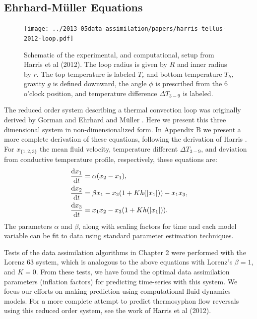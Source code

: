 \documentclass[12pt]{report}
\newcommand{\diff}[2]{\frac{{\rm d}#1}{{\rm d}#2}}
\begin{document}
\subsection{Ehrhard-M\"{u}ller Equations}

\begin{figure}[t!]
  \centering
  \texttt{[image: ../2013-05data-assimilation/papers/harris-tellus-2012-loop.pdf]}
  \caption[Schematic of the experimental, and computational, setup from Harris et al (2012)]{
    Schematic of the experimental, and computational, setup from Harris et al (2012).
    The loop radius is given by $R$ and inner radius by $r$.
    The top temperature is labeled $T_c$ and bottom temperature $T_h$, gravity $g$ is defined downward, the angle $\phi$ is prescribed from the 6 o'clock position, and temperature difference $\Delta T_{3-9}$ is labeled.
  }
  \label{fig:thermosyphons}
\end{figure}

The reduced order system describing a thermal convection loop was originally derived by Gorman  and Ehrhard and M\"{u}ller .
Here we present this three dimensional system in non-dimensionalized form.
In Appendix B we present a more complete derivation of these equations, following the derivation of Harris .
For $x_{\{1,2,3\}}$ the mean fluid velocity, temperature different $\Delta T_{3-9}$, and deviation from conductive temperature profile, respectively, these equations are:
\begin{align}
& \diff{x_1}{t} = \alpha (x_2 - x_1),\\
& \diff{x_2}{t} = \beta x_1 - x_2 (1 + Kh(|x_1|)) - x_1x_3,\\
& \diff{x_3}{t} = x_1x_2 - x_3 (1 + Kh(|x_1|)) .\end{align}
The parameters $\alpha$ and $\beta$, along with scaling factors for time and each model variable can be fit to data using standard parameter estimation techniques.

Tests of the data assimilation algorithms in Chapter 2 were performed with the Lorenz 63 system, which is analogous to the above equations with Lorenz's $\beta = 1$, and $K = 0$.
From these tests, we have found the optimal data assimilation parameters (inflation factors) for predicting time-series with this system.
We focus our efforts on making prediction using computational fluid dynamics models.
For a more complete attempt to predict thermosyphon flow reversals using this reduced order system, see the work of Harris et al (2012).
\end{document}

